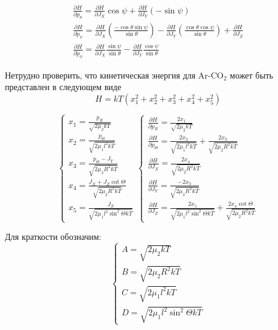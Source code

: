 \begin{equation}
\label{eq:ham_diff}
\begin{aligned}
\frac{\partial H}{\partial p_{\theta}} = 
\frac{\partial H}{\partial J_X}\cos\psi +
\frac{\partial H}{\partial J_Y}(-\sin\psi) \\
\frac{\partial H}{\partial p_{\psi}} = 
\frac{\partial H}{\partial J_X}\left(\frac{-\cos\theta\sin\psi}{\sin\theta}\right) -
\frac{\partial H}{\partial J_Y}\left(\frac{\cos\theta\cos\psi}{\sin\theta}\right) + 
\frac{\partial H}{\partial J_Z} \\
\frac{\partial H}{\partial p_{\phi}} = 
\frac{\partial H}{\partial J_X}\frac{\sin\psi}{\sin\theta} -
\frac{\partial H}{\partial J_Y}\frac{\cos\psi}{\sin\theta} 
\end{aligned}
\end{equation}

Нетрудно проверить, что кинетическая энергия для Ar-$\mathrm{CO_2}$ может быть представлен в следующем виде
\[
H = kT (x_1^2+x_2^2+x_3^2+x_4^2+x_5^2)
\]

\begin{equation}
\label{eq:system}
\begin{cases}
x_1=\frac{p_R}{\sqrt{2\mu_2 kT}} \\
x_2=\frac{p_{\Theta}}{\sqrt{2\mu_1 l^2 kT}} \\
x_3=\frac{p_{\Theta}-J_Y}{\sqrt{2\mu_2 R^2 kT}} \\
x_4=\frac{J_X+J_Z \cot\Theta }{\sqrt{2\mu_2 R^2 kT}}\\
x_5=\frac{J_Z}{\sqrt{2\mu_1 l^2 \sin^2\Theta kT}}
\end{cases}
\begin{cases}
\frac{\partial H}{\partial p_R}=\frac{2x_1}{\sqrt{2\mu_2 kT}} \\
\frac{\partial H}{\partial p_{\Theta}}=\frac{2x_2}{\sqrt{2\mu_1 l^2 kT}} + \frac{2x_3}{\sqrt{2\mu_2 R^2 kT}} \\
\frac{\partial H}{\partial J_X}=\frac{2x_4}{\sqrt{2\mu_2 R^2 kT}} \\
\frac{\partial H}{\partial J_Y}=\frac{-2x_3}{\sqrt{2\mu_2 R^2 kT}}\\
\frac{\partial H}{\partial J_Z}=\frac{2x_5}{\sqrt{2\mu_1 l^2 \sin^2\Theta kT}}+\frac{2x_4\cot\Theta}{\sqrt{2\mu_2 R^2 kT}}
\end{cases}
\end{equation}

Для краткости обозначим:
\[
\begin{cases}
A=\sqrt{2\mu_2 kT} \\
B={\sqrt{2\mu_2 R^2 kT}} \\
C= {\sqrt{2\mu_1 l^2 kT}} \\
D={\sqrt{2\mu_1 l^2 \sin^2\Theta kT}}
\end{cases}
\]

